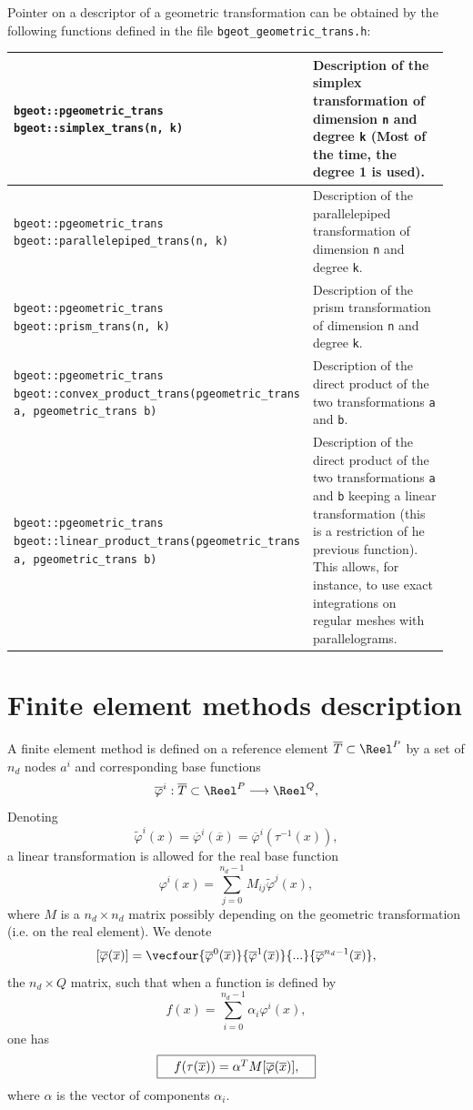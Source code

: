 \documentclass[11pt,a4paper]{article}
\begin{document}
Pointer on a descriptor of a geometric transformation can be obtained by the following functions defined in the file {\tt bgeot\_geometric\_trans.h}:

\begin{center} \begin{tabular}{|m{0.55\linewidth}|m{0.4\linewidth}|} \hline
{\tt bgeot::pgeometric\_trans bgeot::simplex\_trans(n, k)} & Description of the simplex transformation of dimension {\tt n} and degree {\tt k} (Most of the time, the degree 1 is used).\\ \hline
{\tt bgeot::pgeometric\_trans bgeot::parallelepiped\_trans(n, k)} & Description of the parallelepiped transformation of dimension {\tt n} and degree {\tt k}.\\ \hline
{\tt bgeot::pgeometric\_trans bgeot::prism\_trans(n, k)} & Description of the prism transformation of dimension {\tt n} and degree {\tt k}. \\ \hline
{\tt bgeot::pgeometric\_trans bgeot::convex\_product\_trans(pgeometric\_trans a, pgeometric\_trans b)} & Description of the direct product of the two transformations {\tt a} and {\tt b}.\\ \hline
{\tt bgeot::pgeometric\_trans bgeot::linear\_product\_trans(pgeometric\_trans a, pgeometric\_trans b)} & Description of the direct product of the two transformations {\tt a} and {\tt b} keeping a linear transformation (this is a restriction of he previous function). This allows, for instance, to use exact integrations on regular meshes with parallelograms.\\ \hline
\end{tabular} \end{center}

\section{Finite element methods description}

A finite element method is defined on a reference element $\overline{T} \subset \Reel^P$ by a set of $n_d$ nodes $a^i$ and corresponding base functions 
$$ \overline{\varphi}^i : \overline{T} \subset \Reel^P \longrightarrow \Reel^Q, $$
Denoting
$$ \tilde{\varphi}^i(x) = \overline{\varphi}^i(\overline{x}) = \overline{\varphi}^i(\tau^{-1}(x)), $$
a linear transformation is allowed for the real base function
$$ \varphi^i(x) = \sum_{j = 0}^{n_d - 1} M_{ij} \tilde{\varphi}^j(x), $$
where $M$ is a $n_d \times n_d$ matrix possibly depending on the geometric transformation (i.e. on the real element).
We denote
$$ [\overline{\varphi}(\overline{x})] = \vecfour{\overline{\varphi}^0(\overline{x})}{\overline{\varphi}^1(\overline{x})}{...}{\overline{\varphi}^{n_d-1}(\overline{x})}, $$
the $n_d \times Q$ matrix, such that when a function is defined by
$$ f(x) = \sum_{i = 0}^{n_d - 1} \alpha_i \varphi^i(x), $$
one has
$$ \fbox{$\hspace{1em} f(\tau(\overline{x})) = \alpha^T M [\overline{\varphi}(\overline{x})],\hspace{1em}$} $$
where $\alpha$ is the vector of components $\alpha_i$.
\end{document}

